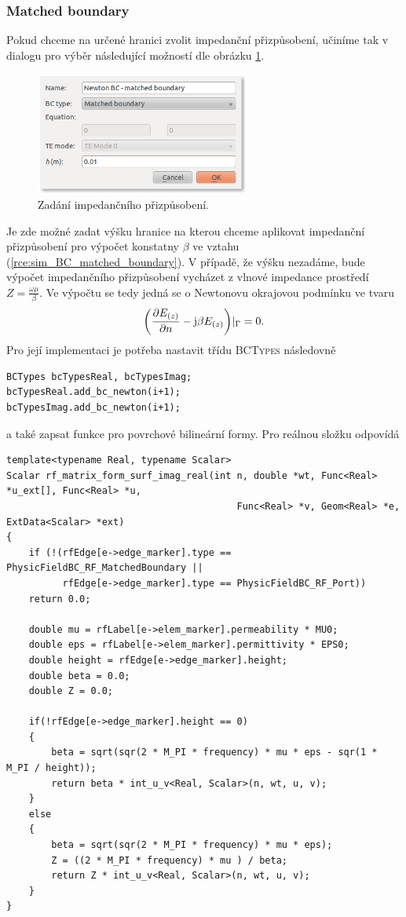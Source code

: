 \subsubsection*{Matched boundary}
Pokud chceme na určené hranici zvolit impedanční přizpůsobení, učiníme tak v dialogu pro výběr následující možností dle obrázku \ref{obr:sim_BC_matched_boundary}. 
\begin{figure}[!h]
	\centering
	\includegraphics[width=7cm]{sim_BC_matched_boundary.png}
	\caption{Zadání impedančního přizpůsobení.}
	\label{obr:sim_BC_matched_boundary}
\end{figure}
Je zde možné zadat výšku hranice na kterou chceme aplikovat impedanční přizpůsobení pro výpočet konstatny $\beta$ ve vztahu (\ref{rce:sim_BC_matched_boundary}). V případě, že výšku nezadáme, bude výpočet impedančního přizpůsobení vycházet z vlnové impedance prostředí $Z = \frac{\omega\mu}{\beta}$. Ve výpočtu se tedy jedná se o Newtonovu okrajovou podmínku ve tvaru
\begin{equation}
	\bigg(\frac{\partial E_{(z)}}{\partial n} - \mathrm{j}\beta E_{(z)}\bigg)|_{\Gamma} = 0.
	\label{rce:sim_BC_matched_boundary}
\end{equation}
Pro její implementaci je potřeba nastavit třídu \textsc{BCTypes} následovně
\begin{verbatim}
BCTypes bcTypesReal, bcTypesImag;
bcTypesReal.add_bc_newton(i+1);
bcTypesImag.add_bc_newton(i+1);              
\end{verbatim}
a také zapsat funkce pro povrchové bilineární formy. Pro reálnou složku odpovídá 
\begin{verbatim}
template<typename Real, typename Scalar>
Scalar rf_matrix_form_surf_imag_real(int n, double *wt, Func<Real> *u_ext[], Func<Real> *u,
                                         Func<Real> *v, Geom<Real> *e, ExtData<Scalar> *ext)
{
    if (!(rfEdge[e->edge_marker].type == PhysicFieldBC_RF_MatchedBoundary ||
          rfEdge[e->edge_marker].type == PhysicFieldBC_RF_Port))
    return 0.0;

    double mu = rfLabel[e->elem_marker].permeability * MU0;
    double eps = rfLabel[e->elem_marker].permittivity * EPS0;
    double height = rfEdge[e->edge_marker].height;
    double beta = 0.0;
    double Z = 0.0;

    if(!rfEdge[e->edge_marker].height == 0)
    {
        beta = sqrt(sqr(2 * M_PI * frequency) * mu * eps - sqr(1 * M_PI / height));
        return beta * int_u_v<Real, Scalar>(n, wt, u, v);
    }
    else
    {
        beta = sqrt(sqr(2 * M_PI * frequency) * mu * eps);
        Z = ((2 * M_PI * frequency) * mu ) / beta;
        return Z * int_u_v<Real, Scalar>(n, wt, u, v);
    }
}
\end{verbatim}

